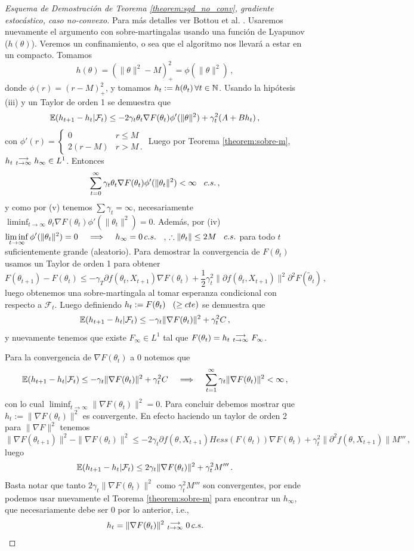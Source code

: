 \begin{proof}[Esquema de Demostración de Teorema \ref{theorem:sgd_no_conv}, gradiente estocástico, caso no-convexo]
\gris 
Para más detalles ver Bottou et al. \cite{bottou}.
\newp Usaremos nuevamente el argumento con sobre-martingalas usando una función de Lyapunov ($h(\theta)$). Veremos un confinamiento, o sea que el algoritmo nos llevará a estar en un compacto. Tomamos
$$ h(\theta) = (\|\theta\|^2-M)^2_+=\phi(\|\theta\|^2)\,,$$
donde $\phi(r)=(r-M)_+^2$, y tomamos $h_t:=h(\theta_t)\,\forall t\in\mathbb{N}$. Usando la hipótesis (iii) y un Taylor de orden 1 se demuestra que
$$ \mathbb{E}(h_{t+1}-h_t|\mathcal{F}_t) \leq -2\gamma_t\theta_t\nabla F(\theta_t)\phi'(\|\theta\|^2)+\gamma_t^2(A+Bh_t) \,, $$
con $\phi'(r)=\begin{cases}
0 & r\leq M \\ 2(r-M) & r>M \, .
\end{cases}$ 
\newline Luego por Teorema \ref{theorem:sobre-m}, $h_t\mbox{ }\substack{\longrightarrow \\ t\to\infty}\mbox{ } h_\infty\in L^1$. Entonces
$$ \displaystyle\sum_{t=0}^\infty\gamma_t\theta_t\nabla F(\theta_t)\phi'(\|\theta_t\|^2)<\infty\hspace{.25cm}\, c.s. \, , $$
y como por (v) tenemos $\sum\gamma_t=\infty$, necesariamente $\displaystyle\liminf_{t\to\infty} \theta_t\nabla F(\theta_t)\phi'(\|\theta_t\|^2) = 0$. Además, por (iv) $\displaystyle\liminf_{t\to\infty}\phi'(\|\theta_t\|^2)=0\hspace{.25cm}\, \implies \hspace{.25cm}\, h_\infty=0\,c.s.\hspace{.25cm}\,$, $\therefore \|\theta_t\|\leq 2M \hspace{.25cm}\, c.s.$ para todo $t$ suficientemente grande (aleatorio).
\newp Para demostrar la convergencia de $F(\theta_t)$ usamos un Taylor de orden 1 para obtener 
$$ F(\theta_{t+1})-F(\theta_t)\leq -\gamma_T\partial f(\theta_t,X_{t+1})\nabla F(\theta_t)+\frac{1}{2}\gamma^2_t\|\partial f(\theta_t,X_{t+1})\|^2\partial^2F(\tilde{\theta}_t) \,,$$
luego obtenemos una sobre-martingala al tomar esperanza condicional con respecto a $\mathcal{F}_t$. Luego definiendo $h_t:=F(\theta_t)\hspace{.25cm}\,(\geq cte)$ se demuestra que
$$ \mathbb{E}(h_{t+1}-h_t|\mathcal{F}_t) \leq -\gamma_t\|\nabla F(\theta_t)\|^2+\gamma_t^2C \,,$$
y nuevamente tenemos que existe $F_\infty\in L^1$ tal que $F(\theta_t)=h_t\mbox{ }\substack{\longrightarrow \\ t\to\infty}\mbox{ } F_\infty$.

\newp Para la convergencia de $\nabla F(\theta_t)$ a $0$ notemos que
$$ \mathbb{E}(h_{t+1}-h_t|\mathcal{F}_t) \leq -\gamma_t\|\nabla F(\theta_t)\|^2+\gamma_t^2C \hspace{.25cm}\, \implies \hspace{.25cm}\, \displaystyle\sum^\infty_{t=1}\gamma_t\|\nabla F(\theta_t)\|^2<\infty \,,$$
con lo cual $\displaystyle\liminf_{t\to\infty}\|\nabla F(\theta_t)\|^2=0$. Para concluir debemos mostrar que $h_t:=\|\nabla F(\theta_t)\|^2$ es convergente. En efecto haciendo un taylor de orden 2 para $\|\nabla F\|^2$ tenemos
$$ \|\nabla F(\theta_{t+1})\|^2-\|\nabla F(\theta_t)\|^2 \leq -2\gamma_t\partial f(\theta,X_{t+1})Hess(F(\theta_t))\nabla F(\theta_t)+\gamma_t^2\|\partial^2 f(\theta,X_{t+1})\| M''' \,,$$
luego
$$ \mathbb{E}(h_{t+1}-h_t|\mathcal{F}_t) \leq 2\gamma_t\|\nabla F(\theta_t)\|^2 +\gamma_t^2M''' \,.$$
Basta notar que tanto $2\gamma_t\|\nabla F(\theta_t)\|^2$ como $\gamma_t^2M'''$ son convergentes, por ende podemos usar nuevamente el Teorema \ref{theorem:sobre-m} para encontrar un $h_\infty$, que necesariamente debe ser $0$ por lo anterior, i.e.,
$$ h_t = \|\nabla F(\theta_t)\|^2\mbox{ }\substack{\longrightarrow \\ t\to\infty}\mbox{ } 0\,c.s.$$
\findem
\negro
\end{proof}
